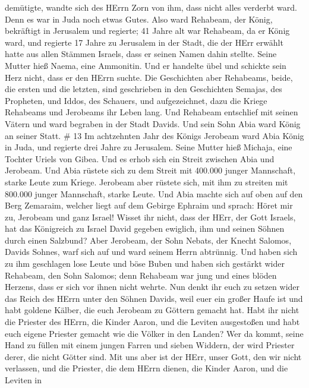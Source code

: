 demütigte, wandte sich des HErrn Zorn von ihm, dass nicht alles verderbt
ward. Denn es war in Juda noch etwas Gutes.  Also ward
Rehabeam, der König, bekräftigt in Jerusalem und regierte; 41 Jahre alt
war Rehabeam, da er König ward, und regierte 17 Jahre zu Jerusalem in
der Stadt, die der HErr erwählt hatte aus allen Stämmen Israels, dass er
seinen Namen dahin stellte. Seine Mutter hieß Naema, eine Ammonitin.
 Und er handelte übel und schickte sein Herz nicht, dass er
den HErrn suchte.  Die Geschichten aber Rehabeams, beide,
die ersten und die letzten, sind geschrieben in den Geschichten Semajas,
des Propheten, und Iddos, des Schauers, und aufgezeichnet, dazu die
Kriege Rehabeams und Jerobeams ihr Leben lang.  Und
Rehabeam entschlief mit seinen Vätern und ward begraben in der Stadt
Davids. Und sein Sohn Abia ward König an seiner Statt. \# 13
 Im achtzehnten Jahr des Königs Jerobeam ward Abia König in
Juda,  und regierte drei Jahre zu Jerusalem. Seine Mutter
hieß Michaja, eine Tochter Uriels von Gibea. Und es erhob sich ein
Streit zwischen Abia und Jerobeam.  Und Abia rüstete sich zu
dem Streit mit 400.000 junger Mannschaft, starke Leute zum Kriege.
Jerobeam aber rüstete sich, mit ihm zu streiten mit 800.000 junger
Mannschaft, starke Leute.  Und Abia machte sich auf oben auf
den Berg Zemaraim, welcher liegt auf dem Gebirge Ephraim und sprach:
Höret mir zu, Jerobeam und ganz Israel!  Wisset ihr nicht,
dass der HErr, der Gott Israels, hat das Königreich zu Israel David
gegeben ewiglich, ihm und seinen Söhnen durch einen Salzbund?
 Aber Jerobeam, der Sohn Nebats, der Knecht Salomos, Davids
Sohnes, warf sich auf und ward seinem Herrn abtrünnig.  Und
haben sich zu ihm geschlagen lose Leute und böse Buben und haben sich
gestärkt wider Rehabeam, den Sohn Salomos; denn Rehabeam war jung und
eines blöden Herzens, dass er sich vor ihnen nicht wehrte. 
Nun denkt ihr euch zu setzen wider das Reich des HErrn unter den Söhnen
Davids, weil euer ein großer Haufe ist und habt goldene Kälber, die euch
Jerobeam zu Göttern gemacht hat.  Habt ihr nicht die
Priester des HErrn, die Kinder Aaron, und die Leviten ausgestoßen und
habt euch eigene Priester gemacht wie die Völker in den Landen? Wer da
kommt, seine Hand zu füllen mit einem jungen Farren und sieben Widdern,
der wird Priester derer, die nicht Götter sind.  Mit uns
aber ist der HErr, unser Gott, den wir nicht verlassen, und die
Priester, die dem HErrn dienen, die Kinder Aaron, und die Leviten in
